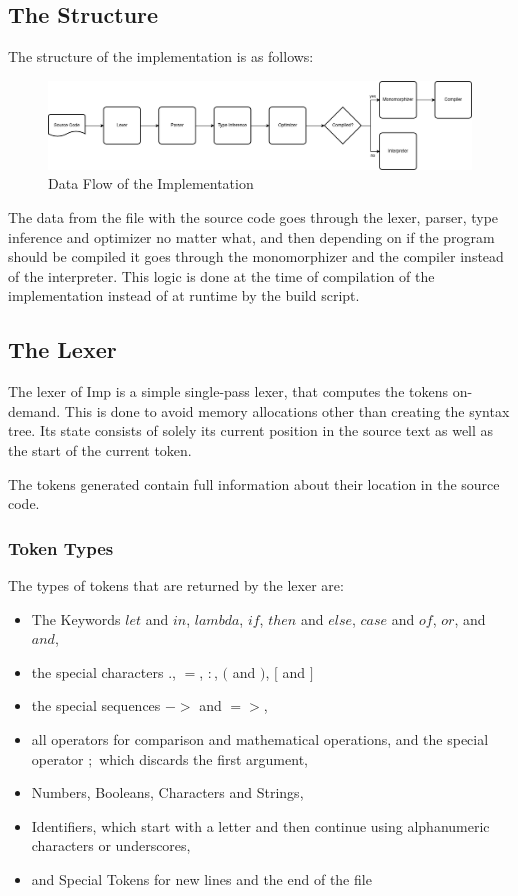 \documentclass[12pt]{article}
\begin{document}
\subsection{The Structure}
The structure of the implementation is as follows:
\begin{figure}[H]
	\centering
	\includegraphics[width=\textwidth]{diagrams/DataFlow.png}
	\caption{Data Flow of the Implementation}
\end{figure}
The data from the file with the source code goes through the lexer,
parser, type inference and optimizer no matter what, and then depending
on if the program should be compiled it goes through the monomorphizer and
the compiler instead of the interpreter. This logic is done at the time of compilation
of the implementation instead of at runtime by the build script.

\subsection{The Lexer}
The lexer of Imp is a simple single-pass lexer, that computes
the tokens on-demand. This is done to avoid memory
allocations other than creating the syntax tree.
Its state consists of solely its
current position in the source text as well as the start
of the current token.

The tokens generated contain full information
about their location in the source code.

\subsubsection{Token Types}
The types of tokens that are returned by the lexer are:
\begin{itemize}
	\item The Keywords $let$ and $in$, $lambda$, $if$, $then$ and $else$,
	      $case$ and $of$, $or$, and $and$,
	\item the special characters $.$, $=$, $:$, $($ and $)$, $[$ and $]$
	\item the special sequences $->$ and $=>$,
	\item all operators for comparison and mathematical operations,
	      and the special operator $;$ which discards the first argument,
	\item Numbers, Booleans, Characters and Strings,
	\item Identifiers, which start with a letter and
	      then continue using alphanumeric characters or underscores,
	\item and Special Tokens for new lines and the end of the file
\end{itemize}
\end{document}
